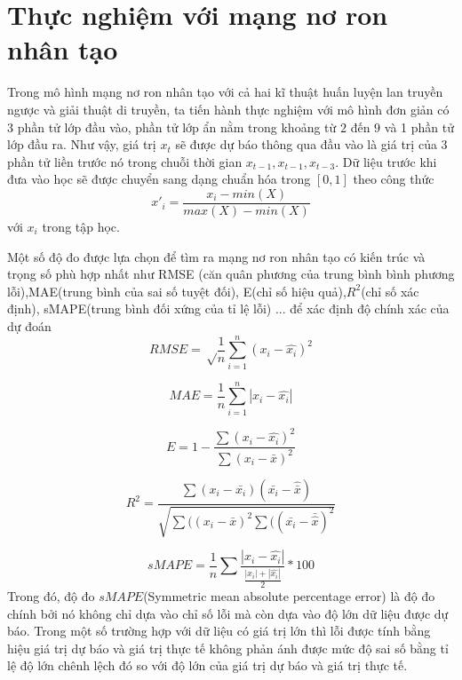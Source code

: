 \section{Thực nghiệm với mạng nơ ron nhân tạo}
Trong mô hình mạng nơ ron nhân tạo với cả hai kĩ thuật huấn luyện lan truyền ngược và giải thuật di truyền, ta tiến hành thực nghiệm với mô hình đơn giản có 3 phần tử lớp đầu vào, phần tử lớp ẩn nằm trong khoảng từ $2$ đến $9$ và 1 phần tử lớp đầu ra. Như vậy, giá trị $x_t$ sẽ được dự báo thông qua đầu vào là giá trị của 3 phần tử liền trước nó trong chuỗi thời gian $x_{t-1}, x_{t-1}, x_{t-3}$. Dữ liệu trước khi đưa vào học sẽ được chuyển sang dạng chuẩn hóa trong $[0,1]$ theo công thức
\begin{equation}
	x'_{i} = \frac{x_i - min(X)}{max(X) - min (X)}
\end{equation}
với $x_i$ trong tập học.

Một số độ đo được lựa chọn để tìm ra mạng nơ ron nhân tạo có kiến trúc và trọng số phù hợp nhất như RMSE (căn quân phương của trung bình bình phương lỗi),MAE(trung bình của sai số tuyệt đối), E(chỉ số hiệu quả),$R^2$(chỉ số xác định), sMAPE(trung bình đối xứng của tỉ lệ lỗi) ... để xác định độ chính xác của dự đoán
\begin{equation}
	RMSE = \sqrt\frac{1}{n} \sum\limits_{i=1}^{n}(x_i - \hat{x_i})^{2}
\end{equation}

\begin{equation}
	MAE = \frac{1}{n} \sum\limits_{i=1}^{n}|x_i - \hat{x_i}|
\end{equation}

\begin{equation}
E = 1 - \frac{\sum(x_i-\hat{x_i})^2}{\sum(x_i-\bar{x})^2}
\end{equation}

\begin{equation}
	R^2 = \frac{\sum(x_i-\bar{x_i})(\bar{x_i}-\hat{\bar{x}})}{\sqrt{\sum((x_i-\bar{x})^2\sum((\bar{x_i}-\bar{\hat{x}})^2}}
\end{equation}

\begin{equation}
sMAPE =\frac{1}{n} \sum\frac{|x_i-\hat{x_i}|}{\frac{|x_i|+|\hat{x_i}|}{2}}*100
\end{equation}
Trong đó, độ đo $sMAPE$(Symmetric mean absolute percentage error) là độ đo chính bởi nó không chỉ dựa vào chỉ số lỗi mà còn dựa vào độ lớn dữ liệu được dự báo. Trong một số trường hợp với dữ liệu có giá trị lớn thì lỗi được tính bằng hiệu giá trị dự báo và giá trị thực tế không phản ánh được mức độ sai số bằng tỉ lệ độ lớn chênh lệch đó so với độ lớn của giá trị dự báo và giá trị thực tế.

